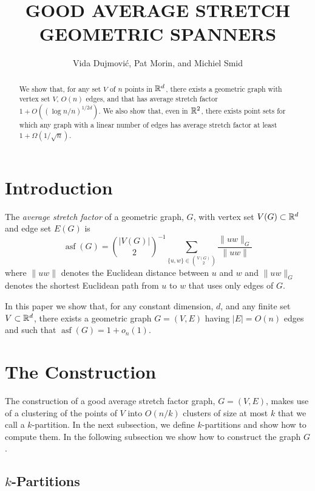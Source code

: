 \documentclass{patmorin}
\title{\MakeUppercase{Good Average Stretch Geometric Spanners}}
\author{Vida Dujmovi\'c, Pat Morin, and Michiel Smid}
\DeclareMathOperator{\asf}{asf}
\begin{document}
\begin{titlepage}
\maketitle

\begin{abstract}
  We show that, for any set $V$ of $n$ points in $\mathbb{R}^d$, there exists
  a geometric graph with vertex set $V$, $O(n)$ edges, and that has
  average stretch factor $1+ O((\log n/n)^{1/2d})$.
  We also show that, even in $\mathbb{R}^2$, there exists point sets for which
  any graph with a linear number of edges has average stretch factor
  at least $1+\Omega(1/\sqrt{n})$.
\end{abstract}

\end{titlepage}

\section{Introduction}

The \emph{average stretch factor} of a geometric graph, $G$, with vertex
set $V(G)\subset \mathbb{R}^d$ and edge set $E(G)$ is
\[
    \asf(G) = \binom{|V(G)|}{2}^{-1}\sum_{\{u,w\}\in\binom{V(G)}{2}}\frac{\|uw\|_G}{\|uw\|}
\]
where $\|uw\|$ denotes the Euclidean distance between $u$ and $w$
and $\|uw\|_G$ denotes the shortest Euclidean path from $u$ to $w$
that uses only edges of $G$.

In this paper we show that, for any constant dimension, $d$, and any
finite set $V\subset \mathbb{R}^d$, there exists a geometric graph $G=(V,E)$
having $|E|=O(n)$ edges and such that $\asf(G)=1+o_n(1)$.

\section{The Construction}

The construction of a good average stretch factor graph, $G=(V,E)$,
makes use of a clustering of the points of $V$ into $O(n/k)$ clusters of
size at most $k$ that we call a $k$-partition.  In the next subsection,
we define $k$-partitions and show how to compute them.  In the following
subsection we show how to construct the graph $G$.

\subsection{$k$-Partitions}
\end{document}
